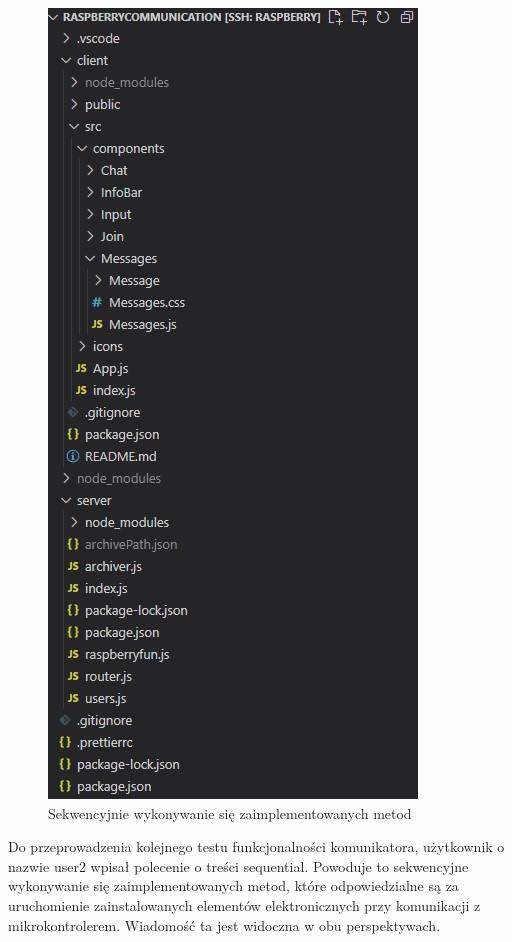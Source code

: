 \begin{figure}
	\centering
	\includegraphics[width=0.5\linewidth]{"obrazy/model"}
	\caption{Sekwencyjnie wykonywanie się zaimplementowanych metod}
	\label{fig:46}
\end{figure}
Do przeprowadzenia kolejnego testu funkcjonalności komunikatora, użytkownik o nazwie user2 wpisał polecenie o treści sequential. Powoduje to sekwencyjne wykonywanie się zaimplementowanych metod, które odpowiedzialne są za uruchomienie zainstalowanych elementów elektronicznych przy komunikacji z mikrokontrolerem. Wiadomość ta jest widoczna w obu perspektywach. 
